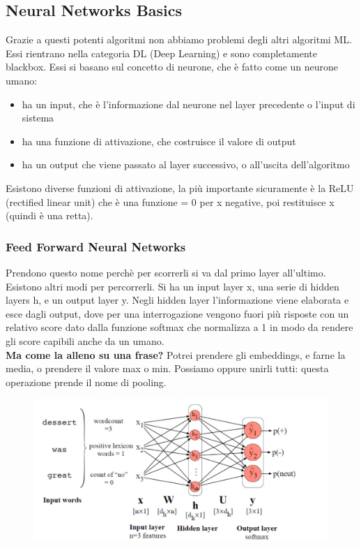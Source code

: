 \subsection{Neural Networks Basics}
Grazie a questi potenti algoritmi non abbiamo problemi degli altri algoritmi ML. Essi rientrano nella categoria DL (Deep Learning) e sono completamente blackbox. Essi si basano sul concetto di neurone, che è fatto come un neurone umano:
\begin{itemize}
    \item ha un input, che è l'informazione dal neurone nel layer precedente o l'input di sistema
    \item ha una funzione di attivazione, che costruisce il valore di output 
    \item ha un output che viene passato al layer successivo, o all'uscita dell'algoritmo
\end{itemize}
Esistono diverse funzioni di attivazione, la più importante sicuramente è la ReLU (rectified linear unit) che è una funzione = 0 per x negative, poi restituisce x (quindi è una retta). 

\subsubsection{Feed Forward Neural Networks}
Prendono questo nome perchè per scorrerli si va dal primo layer all'ultimo. Esistono altri modi per percorrerli. Si ha un input layer x, una serie di hidden layers h, e un output layer y. Negli hidden layer l'informazione viene elaborata e esce dagli output, dove per una interrogazione vengono fuori più risposte con un relativo score dato dalla funzione softmax che normalizza a 1 in modo da rendere gli score capibili anche da un umano. 
\\
\textbf{Ma come la alleno su una frase?} Potrei prendere gli embeddings, e farne la media, o prendere il valore max o min. Possiamo oppure unirli tutti: questa operazione prende il nome di pooling. 
\\
\begin{figure}[th]
    \centering
    \includegraphics[scale=0.5]{Text Analysis/img/NNforNLP.png}
\end{figure}

